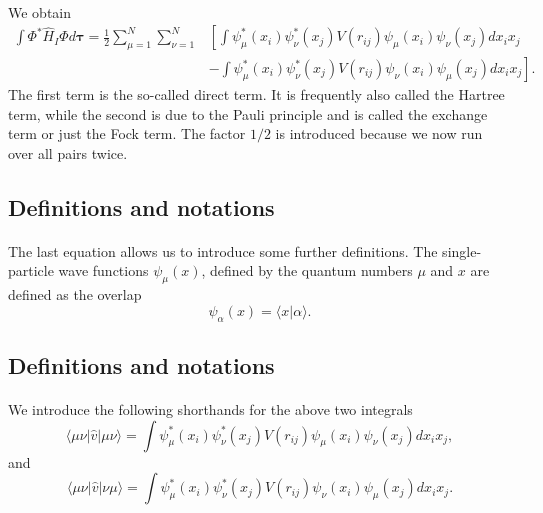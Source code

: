 \documentclass[%
twoside,                 %
final,                   %
10pt]{article}
\begin{document}
\paragraph{}
We obtain
\begin{equation}
\begin{split}
  \int \Phi^*\hat{H}_I\Phi d\mathbf{\tau} 
  = \frac{1}{2}\sum_{\mu=1}^N\sum_{\nu=1}^N
    &\left[ \int \psi_{\mu}^*(x_i)\psi_{\nu}^*(x_j)V(r_{ij})\psi_{\mu}(x_i)\psi_{\nu}(x_j)
    dx_ix_j \right.\\
  &\left.
  - \int \psi_{\mu}^*(x_i)\psi_{\nu}^*(x_j)
  V(r_{ij})\psi_{\nu}(x_i)\psi_{\mu}(x_j)
  dx_ix_j
  \right]. \label{H2Expectation}
\end{split}
\end{equation}
The first term is the so-called direct term. It is frequently also called the  Hartree term, 
while the second is due to the Pauli principle and is called
the exchange term or just the Fock term.
The factor  $1/2$ is introduced because we now run over
all pairs twice.



\subsection{Definitions and notations}

\paragraph{}
The last equation allows us to  introduce some further definitions.  
The single-particle wave functions $\psi_{\mu}(x)$, defined by the quantum numbers $\mu$ and $x$
are defined as the overlap 
\[
   \psi_{\alpha}(x)  = \langle x | \alpha \rangle .
\]



\subsection{Definitions and notations}

\paragraph{}
We introduce the following shorthands for the above two integrals
\[
\langle \mu\nu|\hat{v}|\mu\nu\rangle =  \int \psi_{\mu}^*(x_i)\psi_{\nu}^*(x_j)V(r_{ij})\psi_{\mu}(x_i)\psi_{\nu}(x_j)
    dx_ix_j,
\]
and
\[
\langle \mu\nu|\hat{v}|\nu\mu\rangle = \int \psi_{\mu}^*(x_i)\psi_{\nu}^*(x_j)
  V(r_{ij})\psi_{\nu}(x_i)\psi_{\mu}(x_j)
  dx_ix_j.  
\]
\end{document}
